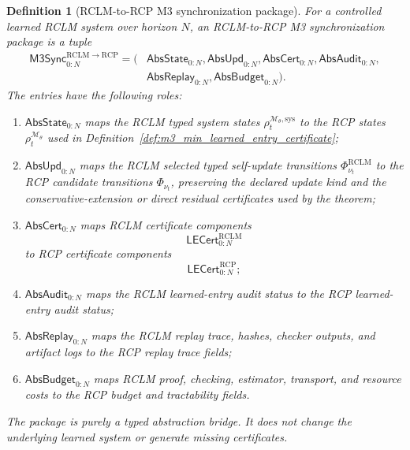 \documentclass[11pt]{article}
\newtheorem{definition}[theorem]{Definition}
\newcommand{\1}{\mathbf{1}}
\newcommand{\RCP}{\mathrm{RCP}}
\providecommand{\RCLM}{\mathrm{RCLM}}
\providecommand{\sys}{\mathrm{sys}}
\begin{document}
\begin{definition}[RCLM-to-RCP M3 synchronization package]
\label{def:m3_sync_rclm_to_rcp_package}
For a controlled learned RCLM system over horizon \(N\), an RCLM-to-RCP M3 synchronization package is a tuple
\[
\begin{aligned}
\mathsf{M3Sync}_{0:N}^{\RCLM\to\RCP}
=(&\mathsf{AbsState}_{0:N},\mathsf{AbsUpd}_{0:N},\mathsf{AbsCert}_{0:N},\mathsf{AbsAudit}_{0:N},\\
&\mathsf{AbsReplay}_{0:N},\mathsf{AbsBudget}_{0:N}).
\end{aligned}
\]
The entries have the following roles:
\begin{enumerate}[label=(\roman*),leftmargin=1.5em]
    \item \(\mathsf{AbsState}_{0:N}\) maps the RCLM typed system states \(\rho_t^{\mathcal M_\theta,\sys}\) to the RCP states \(\rho_t^{\mathcal M_\theta}\) used in Definition~\ref{def:m3_min_learned_entry_certificate};
    \item \(\mathsf{AbsUpd}_{0:N}\) maps the RCLM selected typed self-update transitions \(\Phi_{\nu_t}^{\RCLM}\) to the RCP candidate transitions \(\Phi_{\nu_t}\), preserving the declared update kind and the conservative-extension or direct residual certificates used by the theorem;
    \item \(\mathsf{AbsCert}_{0:N}\) maps RCLM certificate components
    \[
    \mathsf{LECert}_{0:N}^{\RCLM}
    \]
    to RCP certificate components
    \[
    \mathsf{LECert}_{0:N}^{\RCP};
    \]
    \item \(\mathsf{AbsAudit}_{0:N}\) maps the RCLM learned-entry audit status to the RCP learned-entry audit status;
    \item \(\mathsf{AbsReplay}_{0:N}\) maps the RCLM replay trace, hashes, checker outputs, and artifact logs to the RCP replay trace fields;
    \item \(\mathsf{AbsBudget}_{0:N}\) maps RCLM proof, checking, estimator, transport, and resource costs to the RCP budget and tractability fields.
\end{enumerate}
The package is purely a typed abstraction bridge.  It does not change the underlying learned system or generate missing certificates.
\end{definition}
\end{document}
